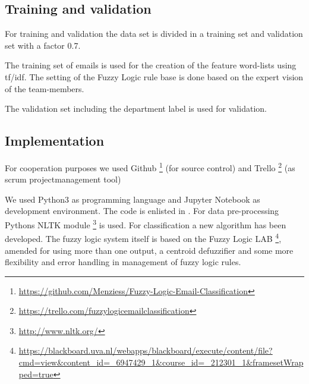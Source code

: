 \documentclass[journal]{IEEEtran}
\begin{document}


\subsection{Training and validation}

For training and validation the data set is divided in a training set and validation set with a factor 0.7.

The training set of emails is used for the creation of the feature word-lists using tf/idf. The setting of the Fuzzy Logic rule base is done based on the expert vision of the team-members. 

The validation set including the department label is used for validation. 

\subsection{Implementation}

For cooperation purposes we used Github \footnote{\url{https://github.com/Menziess/Fuzzy-Logic-Email-Classification}} (for source control) and Trello \footnote{\url{https://trello.com/fuzzylogicemailclassification}} (as scrum projectmanagement tool)

We used Python3 as programming language and Jupyter Notebook as development
environment. The code is enlisted in . For data pre-processing Pythons NLTK module \footnote{\url{http://www.nltk.org/}} is used. For classification a new algorithm has been developed. The fuzzy logic system itself is based on the Fuzzy Logic LAB \footnote{\url{https://blackboard.uva.nl/webapps/blackboard/execute/content/file?cmd=view&content_id=_6947429_1&course_id=_212301_1&framesetWrapped=true}}, amended for using more than one output, a centroid defuzzifier and some more flexibility and error handling in management of fuzzy logic rules.
\end{document}

